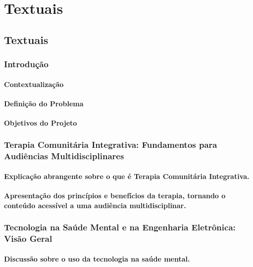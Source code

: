 \part{Textuais}

\chapter[Textuais]{Textuais}

\section{Introdução}
\subsection{Contextualização}
\subsection{Definição do Problema}
\subsection{Objetivos do Projeto}

\section{Terapia Comunitária Integrativa: Fundamentos para Audiências Multidisciplinares}
\subsection{Explicação abrangente sobre o que é Terapia Comunitária Integrativa.}
\subsection{Apresentação dos princípios e benefícios da terapia, tornando o conteúdo acessível a uma audiência multidisciplinar.}
\section{Tecnologia na Saúde Mental e na Engenharia Eletrônica: Visão Geral}
\subsection{Discussão sobre o uso da tecnologia na saúde mental.}

